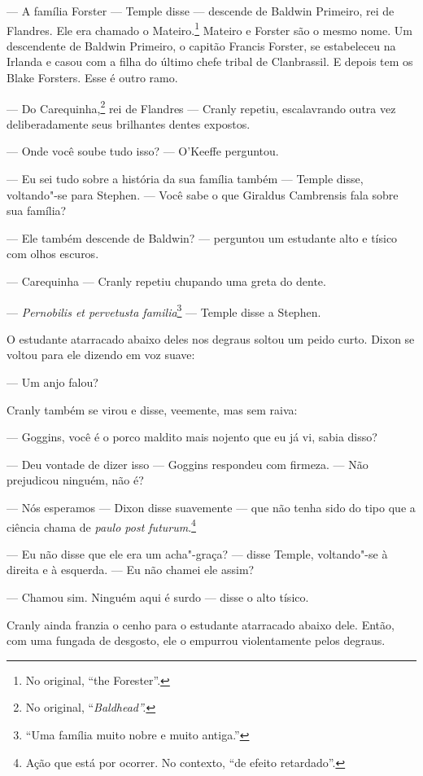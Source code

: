 \bigskip

 --- A família Forster --- Temple disse --- descende de Baldwin Primeiro, rei de
Flandres. Ele era chamado o Mateiro.\footnote{ No original, “the
Forester”.} Mateiro e Forster são o mesmo nome. Um descendente de
Baldwin Primeiro, o capitão Francis Forster, se estabeleceu na Irlanda
e casou com a filha do último chefe tribal de Clanbrassil. E depois tem
os Blake Forsters. Esse é outro ramo.

--- Do Carequinha,\footnote{ No original, “\textit{Baldhead”.}} rei de
Flandres --- Cranly repetiu, escalavrando outra vez deliberadamente seus
brilhantes dentes expostos.

 --- Onde você soube tudo isso? --- O’Keeffe perguntou.

 --- Eu sei tudo sobre a história da sua família também --- Temple disse, voltando"-se para 
Stephen. --- Você sabe o que Giraldus Cambrensis fala sobre sua família?          

 --- Ele também descende de Baldwin? --- perguntou um estudante alto e tísico
com olhos escuros.

 --- Carequinha --- Cranly repetiu  chupando uma greta do dente.

 --- \textit{Pernobilis et pervetusta familia}\footnote{ “Uma família muito
nobre e muito antiga.”} --- Temple disse a Stephen.

O estudante atarracado abaixo deles nos degraus soltou um peido curto.
Dixon se voltou para ele dizendo em voz suave:

 --- Um anjo falou?

Cranly também se virou e disse, veemente, mas sem raiva:

 --- Goggins, você é o porco maldito mais nojento que eu já vi, sabia disso?

 --- Deu vontade de dizer isso --- Goggins respondeu com firmeza. --- Não
prejudicou ninguém, não é?

 --- Nós esperamos --- Dixon disse suavemente --- que não tenha sido do tipo que
a ciência chama de \textit{paulo post futurum}.\footnote{ Ação que está
por ocorrer. No contexto, “de efeito retardado”.}

 --- Eu não disse que ele era um acha"-graça? --- disse Temple, voltando"-se à
direita e à esquerda. --- Eu não chamei ele assim?

 --- Chamou sim. Ninguém aqui é surdo --- disse o alto tísico.

Cranly ainda franzia o cenho para o estudante atarracado abaixo dele.
Então, com uma fungada de desgosto, ele o empurrou violentamente pelos
degraus.

